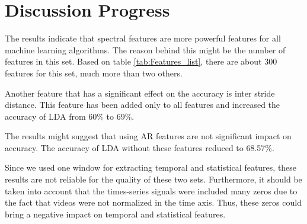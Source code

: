 \section{Discussion Progress}

The results indicate that spectral features are more powerful features for all machine learning algorithms. The reason behind this might be the number of features in this set. Based on table \ref{tab:Features_list}, there are about 300 features for this set, much more than two others.

Another feature that has a significant effect on the accuracy is inter stride distance. This feature has been added only to all features and increased the accuracy of LDA from 60\% to 69\%. 
 
The results might suggest that using AR features are not significant impact on accuracy. The accuracy of LDA without these features reduced to 68.57\%. 

Since we used one window for extracting temporal and statistical features, these results are not reliable for the quality of these two sets. Furthermore, it should be taken into account that the times-series signals were included many zeros due to the fact that videos were not normalized in the time axis. Thus, these zeros could bring a negative impact on temporal and statistical features.










